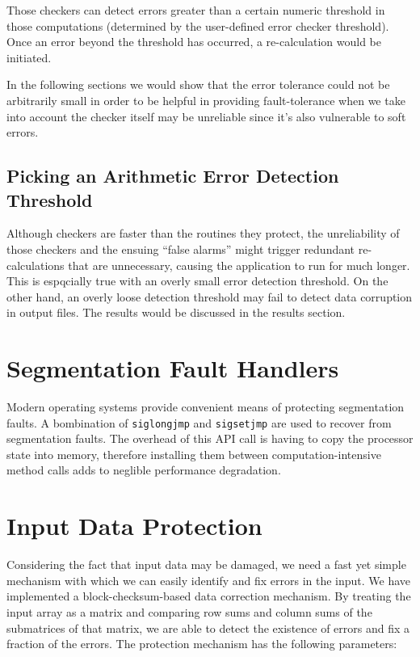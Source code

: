 \documentclass{article}
\begin{document}
Those checkers can detect errors greater than a certain numeric threshold in those computations (determined by the user-defined error checker threshold). Once an error beyond the threshold has occurred, a re-calculation would be initiated.

In the following sections we would show that the error tolerance could not be arbitrarily small in order to be helpful in providing fault-tolerance when we take into account the checker itself may be unreliable since it's also vulnerable to soft errors.

\subsection{Picking an Arithmetic Error Detection Threshold}

Although checkers are faster than the routines they protect, the unreliability of those checkers and the ensuing ``false alarms'' might trigger redundant re-calculations that are unnecessary, causing the application to run for much longer. This is espqcially true with an overly small error detection threshold. On the other hand, an overly loose detection threshold may fail to detect data corruption in output files. The results would be discussed in the results section.

\section{Segmentation Fault Handlers}

Modern operating systems provide convenient means of protecting segmentation faults. A bombination of \texttt{siglongjmp} and \texttt{sigsetjmp} are used to recover from segmentation faults. The overhead of this API call is having to copy the processor state into memory, therefore installing them between computation-intensive method calls adds to neglible performance degradation.

\section{Input Data Protection}

Considering the fact that input data may be damaged, we need a fast yet simple mechanism with which we can easily identify and fix errors in the input. We have implemented a block-checksum-based data correction mechanism. By treating the input array as a matrix and comparing row sums and column sums of the submatrices of that matrix, we are able to detect the existence of errors and fix a fraction of the errors. The protection mechanism has the following parameters:
\end{document}
